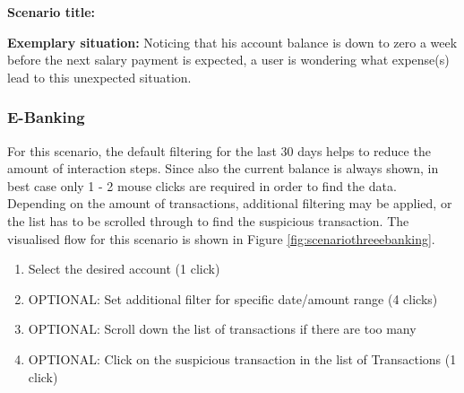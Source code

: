 \textbf{Scenario title:} \scenthree

\textbf{Exemplary situation:} Noticing that his account balance is down to zero a week before the next salary payment is expected, a user is wondering what expense(s) lead to this unexpected situation.



\subsubsection{E-Banking}

For this scenario, the default filtering for the last 30 days helps to reduce the amount of interaction steps. Since also the current balance is always shown, in best case only 1 - 2 mouse clicks are required in order to find the data. Depending on the amount of transactions, additional filtering may be applied, or the list has to be scrolled through to find the suspicious transaction. The visualised flow for this scenario is shown in Figure \ref{fig:scenariothreeebanking}.
\begin{enumerate}
	\item Select the desired account (1 click)
	\item OPTIONAL: Set additional filter for specific date/amount range (4 clicks)
	\item OPTIONAL: Scroll down the list of transactions if there are too many
	\item OPTIONAL: Click on the suspicious transaction in the list of Transactions (1 click)
\end{enumerate}
